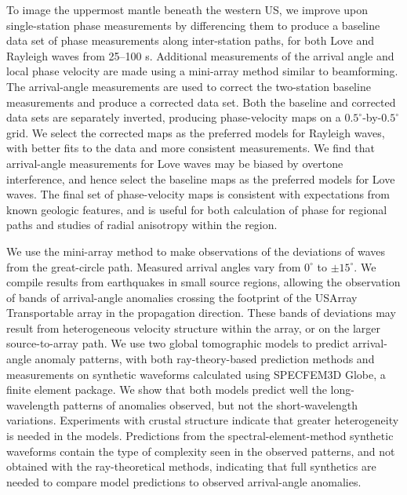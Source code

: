 \documentclass[12pt,oneside]{book}
\newcommand{\degree}[1]{\mbox{$#1^{\circ}$}}
\begin{document}
To image the uppermost mantle beneath the western US, we improve upon single-station phase measurements by differencing them to produce a baseline data set of phase measurements along inter-station paths, for both Love and Rayleigh waves from 25--100 s. Additional measurements of the arrival angle and local phase velocity are made using a mini-array method similar to beamforming. The arrival-angle measurements are used to correct the two-station baseline measurements and produce a corrected data set. Both the baseline and corrected data sets are separately inverted, producing phase-velocity maps on a \degree{0.5}\nobreakdash-by\nobreakdash-\degree{0.5} grid. We select the corrected maps as the preferred models for Rayleigh waves, with better fits to the data and more consistent measurements. We find that arrival-angle measurements for Love waves may be biased by overtone interference, and hence select the baseline maps as the preferred models for Love waves. The final set of phase-velocity maps is consistent with expectations from known geologic features, and is useful for both calculation of phase for regional paths and studies of radial anisotropy within the region. 

We use the mini-array method to make observations of the deviations of waves from the great-circle path. Measured arrival angles vary from \degree{0} to $\pm\degree{15}$. We compile results from earthquakes in small source regions, allowing the observation of bands of arrival-angle anomalies crossing the footprint of the USArray Transportable array in the propagation direction. These bands of deviations may result from heterogeneous velocity structure within the array, or on the larger source-to-array path. We use two global tomographic models to predict arrival-angle anomaly patterns, with both ray-theory-based prediction methods and measurements on synthetic waveforms calculated using SPECFEM3D Globe, a finite element package. We show that both models predict well the long-wavelength patterns of anomalies observed, but not the short-wavelength variations. Experiments with crustal structure indicate that greater heterogeneity is needed in the models. Predictions from the spectral-element-method synthetic waveforms contain the type of complexity seen in the observed patterns, and not obtained with the ray-theoretical methods, indicating that full synthetics are needed to compare model predictions to observed arrival-angle anomalies. 
\end{document}
